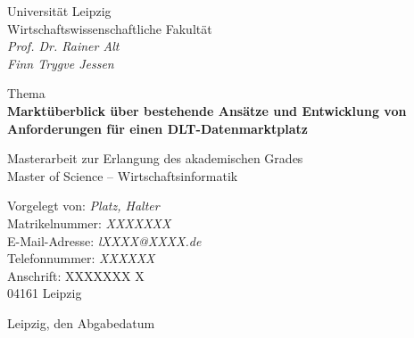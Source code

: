 \documentclass[paper=a4,
fontsize=12pt,
toc=listof,
bibliography=totoc,
numbers=noendperiod %
]{scrreprt}
\begin{document}
\begin{titlepage}
{{ \noindent  Universität Leipzig \\
		Wirtschaftswissenschaftliche Fakultät\\
		\itshape Prof. Dr. Rainer Alt\\
		Finn Trygve Jessen\\	 \par}
	\vspace{2cm}
	{\centering  Thema \\
	\bfseries \large Marktüberblick über bestehende Ansätze und Entwicklung von Anforderungen für einen DLT-Datenmarktplatz\par}
	\vspace{2cm}
	{ \centering  Masterarbeit zur Erlangung des akademischen Grades\\
	     Master of Science – Wirtschaftsinformatik
		\par}

	\vfill}

	{\noindent Vorgelegt von: \textit{Platz,  Halter } \\
	 Matrikelnummer: \textit{XXXXXXX} \\
	 E-Mail-Adresse: \textit{lXXXX@XXXX.de} \\
	 Telefonnummer: \textit{XXXXXX} \\
	 Anschrift:  {XXXXXXX X\\
						\hspace*{1.75cm} 04161 Leipzig} \\ } 
		
		{\noindent  Leipzig, den Abgabedatum\par}
\end{titlepage}




\tableofcontents
\newpage

\listoffigures
\newpage




   

\listoftables
\newpage
\clearpage
\end{document}
